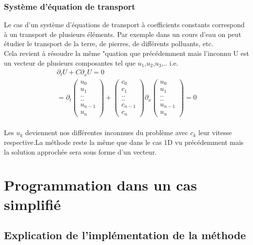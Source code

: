 \documentclass[12pt]{article}
\begin{document}
\subsubsection{Système d'équation de transport}
Le cas d'un système d'équations de transport à coefficients constants correspond à un transport de plusieurs éléments. Par exemple dans un cours d'eau on peut étudier le transport de la terre, de pierres, de différents polluants, etc.
\\Cela revient à résoudre la même "quation que précédemment mais l'inconnu U est un vecteur de plusieurs composantes tel que $u_1$,$u_2$,$u_3$,..
i.e.
\\
\begin{eqnarray*}
     \partial_t U + C\partial_x U = 0
     \\=\partial_t \begin{pmatrix}
  u_0\\
  u_1\\
  ..\\
  ..\\
  u_{n-1}\\
  u_n
\end{pmatrix}+        \begin{pmatrix}
  c_0\\
  c_1\\
  ..\\
  ..\\
  c_{n-1}\\
  c_n
\end{pmatrix}\partial_x\begin{pmatrix}
  u_0\\
  u_1\\
  ..\\
  ..\\
  u_{n-1}\\
  u_n
\end{pmatrix} =0
\end{eqnarray*}
\\
Les $u_k$ deviennent nos différentes inconnues du problème avec $c_k$ leur vitesse respective.La méthode reste la même que dans le cas 1D vu précédemment mais la solution approchée sera sous forme d'un vecteur.
\\
\section{Programmation dans un cas simplifié}

\subsection{Explication de l'implémentation de la méthode}
\end{document}
